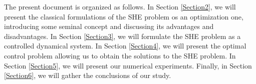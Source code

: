 The present document is organized as follows. In Section \ref{Section2}, we will present the classical formulations of the SHE problem os an optimization one, introducing some seminal concept and discussing its advantages and disadvantages. In Section \ref{Section3}, we will formulate the SHE problem as a controlled dynamical system. In Section \ref{Section4}, we will present the optimal control problem allowing us to obtain the solutions to the SHE problem. In Section \ref{Section5}, we will present our numerical experiments. Finally, in Section \ref{Section6}, we will gather the conclusions of our study. 
